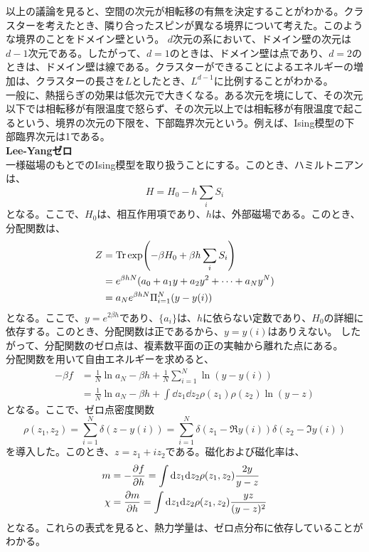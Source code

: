\documentclass[a4paper,11pt]{jsarticle}
\numberwithin{equation}{section}
\begin{document}
以上の議論を見ると、空間の次元が相転移の有無を決定することがわかる。クラスターを考えたとき、隣り合ったスピンが異なる境界について考えた。このような境界のことをドメイン壁という。
$d$次元の系において、ドメイン壁の次元は$d-1$次元である。したがって、$d=1$のときは、ドメイン壁は点であり、$d=2$のときは、ドメイン壁は線である。クラスターができることによるエネルギーの増加は、クラスターの長さを$L$としたとき、$L^{d-1}$に比例することがわかる。\\
一般に、熱揺らぎの効果は低次元で大きくなる。ある次元を境にして、その次元以下では相転移が有限温度で怒らず、その次元以上では相転移が有限温度で起こるという、境界の次元の下限を、下部臨界次元という。例えば、Ising模型の下部臨界次元は1である。\\

\textbf{Lee-Yangゼロ}\\
一様磁場のもとでのIsing模型を取り扱うことにする。このとき、ハミルトニアンは、
\begin{equation}
    H = H_0 - h\sum_i S_i
\end{equation}
となる。ここで、$H_0$は、相互作用項であり、$h$は、外部磁場である。このとき、分配関数は、
\begin{align}
    Z &= \Trace \exp(-\beta H_0 + \beta h\sum_i S_i)\\
    &= e^{\beta hN}(a_0 + a_1y + a_2y^2 + \cdots + a_Ny^N)\\
    &= a_N e^{\beta hN}\Pi_{i=1}^N(y-y(i))
\end{align}
となる。ここで、$y = e^{2\beta h}$であり、$\{a_i\}$は、$h$に依らない定数であり、$H_0$の詳細に依存する。このとき、分配関数は正であるから、$y=y(i)$はありえない。
したがって、分配関数のゼロ点は、複素数平面の正の実軸から離れた点にある。\\
分配関数を用いて自由エネルギーを求めると、
\begin{align}
  -\beta f &=\frac{1}{N}\ln a_N -\beta h +\frac{1}{N}\sum_{i=1}^N\ln(y-y(i))\\
  &=\frac{1}{N}\ln a_N -\beta h +\int \dd z_1 \dd z_2 \rho(z_1)\rho(z_2)\ln(y-z)
\end{align}
となる。ここで、ゼロ点密度関数
\begin{equation}
    \rho(z_1,z_2) = \sum_{i=1}^N\delta(z - y(i)) = \sum_{i=1}^N\delta(z_1 - \Re y(i))\delta(z_2 - \Im y(i))
\end{equation}
を導入した。このとき、$z = z_1 + iz_2$である。磁化および磁化率は、
\begin{align}
    m &= -\pdv{f}{h} = \int \dd z_1 \dd z_2 \rho(z_1,z_2)\frac{2y}{y-z}\\
    \chi &= \pdv{m}{h} = \int \dd z_1 \dd z_2 \rho(z_1,z_2)\frac{yz}{(y-z)^2}
\end{align}
となる。これらの表式を見ると、熱力学量は、ゼロ点分布に依存していることがわかる。\\
\end{document}
